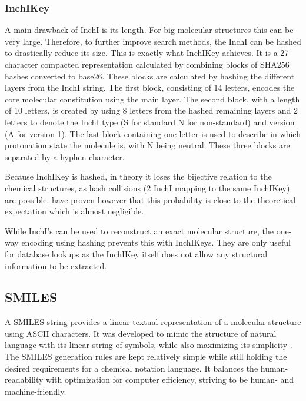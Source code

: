 \subsubsection{InchIKey}

A main drawback of InchI is its length. For big molecular structures this can be very large.
Therefore, to further improve search methods, the InchI can be hashed to drastically reduce its size.
This is exactly what InchIKey achieves.
It is a 27-character compacted representation calculated by combining blocks of SHA256 hashes converted to base26.
These blocks are calculated by hashing the different layers from the InchI string.
The first block, consisting of 14 letters, encodes the core molecular constitution using the main layer.
The second block, with a length of 10 letters, is created by using 8 letters from the hashed remaining layers and 2 letters to denote the InchI type (S for standard N for non-standard) and version (A for version 1).
The last block containing one letter is used to describe in which protonation state the molecule is, with N being neutral.
These three blocks are separated by a hyphen character.

Because InchIKey is hashed, in theory it loses the bijective relation to the chemical structures, as hash collisions (2 InchI mapping to the same InchIKey) are possible.
\textcite{pletnev2012inchikey} have proven however that this probability is close to the theoretical expectation which is almost negligible.

While InchI's can be used to reconstruct an exact molecular structure, the one-way encoding using hashing prevents this with InchIKeys. They are only useful for database lookups as the InchIKey itself does not allow any structural information to be extracted. 

\subsection{SMILES}

A \ac{SMILES} string provides a linear textual representation of a molecular structure using ASCII characters.
It was developed to mimic the structure of natural language with its linear string of symbols, while also maximizing its simplicity \cite{weininger1988smiles}. The SMILES generation rules are kept relatively simple while still holding the desired requirements for a chemical notation language. It balances the human-readability with optimization for computer efficiency, striving to be human- and machine-friendly.


